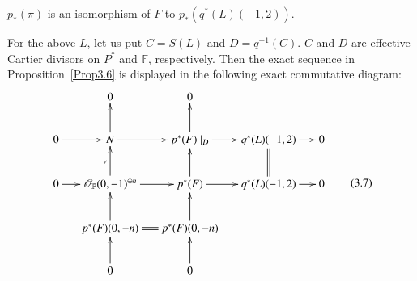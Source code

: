 \begin{cor}\label{cor3.6.1}
$p_{\ast}(\pi)$ is an isomorphism of $F$ to
$p_{\ast}(q^{\ast}(L)(-1,2))$. 
\end{cor}

For the above $L$, let us put $C=S(L)$ and $D=q^{-1}(C)$. $C$ and $D$
are effective Cartier divisors on $P^{\ast}$ and $\mathbb{F}$,
respectively. Then the exact sequence in Proposition~\ref{Prop3.6} is
displayed in the following exact commutative diagram:
\setcounter{equation}{6}
\begin{equation*}
\vcenter{
\xymatrix@C=.5cm{&0 & 0&\\
0\ar[r]&N\ar[u]\ar[r]&p^{\ast}(F)\mid_{D}\ar[u]\ar[r]&q^{\ast}(L)(-1,2)\ar[r]&0\\
0\ar[r]&\mathscr{O}_{\mathbb{F}}(0,-1)^{\oplus
  n}\ar[u]^{\nu}\ar[r]&p^{\ast}(F)\ar[u]\ar[r]&q^{\ast}(L)(-1,2)\ar@{=}[u]\ar[r]&0\\
&p^{\ast}(F)(0,-n)\ar[u]\ar@{=}[r]& p^{\ast}(F)(0,-n)\ar[u]&&\\
&0\ar[u]& 0\ar[u] &&}}\tag{3.7}\label{eqn3.6.7}
\end{equation*}

